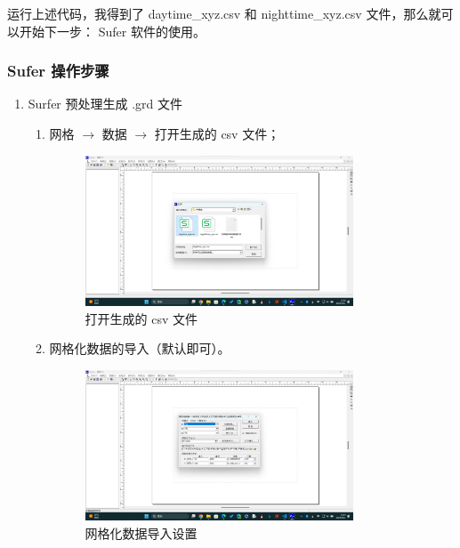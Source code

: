 运行上述代码，我得到了 daytime_xyz.csv 和 nighttime_xyz.csv 文件，那么就可以开始下一步： Sufer 软件的使用。


\subsubsection{Sufer 操作步骤}
\begin{enumerate}
    \item Surfer 预处理生成 .grd 文件
    \begin{enumerate}[label=\arabic*)]
        \item 网格 $\rightarrow $ 数据 $\rightarrow $ 打开生成的 csv 文件；
        \begin{figure}[H]
            \centering
            \includegraphics[width=0.8\textwidth]{figures/Sufer_step1-1.png}
            \caption{打开生成的 csv 文件}
        \end{figure}
        \item 网格化数据的导入（默认即可）。
        \begin{figure}[H]
            \centering
            \includegraphics[width=0.8\textwidth]{figures/Sufer_step1-2.png}
            \caption{网格化数据导入设置}
        \end{figure}
    \end{enumerate}


\end{enumerate}
